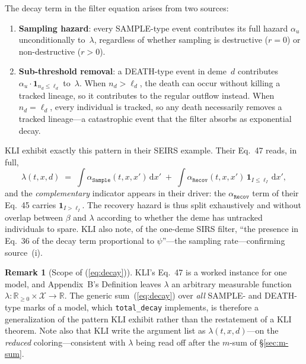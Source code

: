 \documentclass[11pt,leqno]{article}
\newcommand{\Xspace}{\mathcal{X}}   %
\newcommand{\Rp}{\mathbb{R}_{\ge 0}}
\newcommand{\dd}[1]{\,\mathrm{d}{#1}}
\newcommand{\indicator}[1]{\mathbf{1}_{#1}}
\newcommand{\code}[1]{\texttt{#1}}
\theoremstyle{plain}
\theoremstyle{definition}
\newtheorem{remark}[theorem]{Remark}
\begin{document}
The decay term in the filter equation arises from two sources:
\begin{enumerate}
  \item \textbf{Sampling hazard}: every SAMPLE-type event contributes its
    full hazard $\alpha_u$ unconditionally to~$\lambda$, regardless of
    whether sampling is destructive ($r = 0$) or non-destructive ($r > 0$).
  \item \textbf{Sub-threshold removal}: a DEATH-type event in deme~$d$
    contributes $\alpha_u \cdot \indicator{n_d \le \ell_d}$ to~$\lambda$.
    When $n_d > \ell_d$, the death can occur without killing a tracked
    lineage, so it contributes to the regular outflow instead.
    When $n_d = \ell_d$, every individual is tracked, so any death
    necessarily removes a tracked lineage---a catastrophic event that
    the filter absorbs as exponential decay.
\end{enumerate}

KLI exhibit exactly this pattern in their SEIRS example.  Their Eq.~47
reads, in full,
\begin{equation}\label{eq:kli-eq47}
  \lambda(t,x,d) \;=\;
    \int \alpha_{\code{Sample}}(t,x,x') \dd{x'}
    \;+\;
    \int \alpha_{\code{Recov}}(t,x,x')\,
      \indicator{I \le \ell_I} \dd{x'},
\end{equation}
and the \emph{complementary} indicator appears in their driver: the
$\alpha_{\code{Recov}}$ term of their Eq.~45 carries
$\indicator{I > \ell_I}$.  The recovery hazard is thus split
exhaustively and without overlap between $\beta$ and $\lambda$
according to whether the deme has untracked individuals to spare.  KLI
also note, of the one-deme SIRS filter, ``the presence in Eq.~36 of the
decay term proportional to $\psi$''---the sampling rate---confirming
source~(i).

\begin{remark}[Scope of (\ref{eq:decay})]
KLI's Eq.~47 is a worked instance for one model, and Appendix~B's
Definition leaves $\lambda$ an arbitrary measurable function
$\lambda : \Rp \times \Xspace \to \mathbb{R}$.  The generic
sum~(\ref{eq:decay}) over \emph{all} SAMPLE- and DEATH-type marks of a
model, which \code{total\_decay} implements, is therefore a
generalization of the pattern KLI exhibit rather than the restatement
of a KLI theorem.  Note also that KLI write the argument list as
$\lambda(t,x,d)$---on the \emph{reduced} coloring---consistent with
$\lambda$ being read off after the $m$-sum of \S\ref{sec:m-sum}.
\end{remark}
\end{document}
